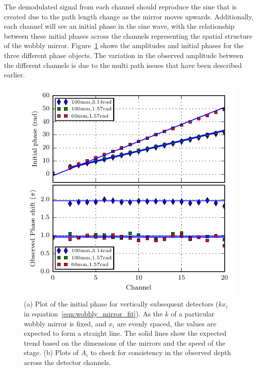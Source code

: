 The demodulated signal from each channel should reproduce the sine that is created due to the path length change as the mirror moves upwards.
Additionally, each channel will see an initial phase in the sine wave, with the relationship between these initial phases across the channels representing the spatial structure of the wobbly mirror. 
Figure~\ref{fig:moving_mirror_amp_phase} shows the amplitudes and initial phases for the three different phase objects. 
The variation in the observed amplitude between the different channels is due to the multi path issues that have been described earlier.

\begin{figure}[!h]
\begin{center}
\includegraphics[]{figures/85368_85372_85391_k-amp.pdf}
\end{center}
\caption{(a) Plot of the initial phase for vertically subsequent detectors ($kx_i$ in equation~\protect\ref{eqn:wobbly_mirror_fit}). As the $k$ of a particular wobbly mirror is fixed, and $x_i$ are evenly spaced, the values are expected to form a straight line. The solid lines show the expected trend based on the dimensions of the mirrors and the speed of the stage. (b) Plots of $A_i$ to check for consistency in the observed depth across the detector channels.}
\label{fig:moving_mirror_amp_phase}
\end{figure}

